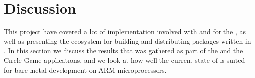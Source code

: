 
\chapter{Discussion}
\label{chap:discussion}

This project have covered a lot of implementation involved with {\rust} and {\C} for the {\gecko}, as well as presenting the ecosystem for building and distributing packages written in {\rust}.
In this section we discuss the results that was gathered as part of the {\tracker} and the Circle Game applications, and we look at how well the current state of {\rust} is suited for bare-metal development on ARM microprocessors.






%

